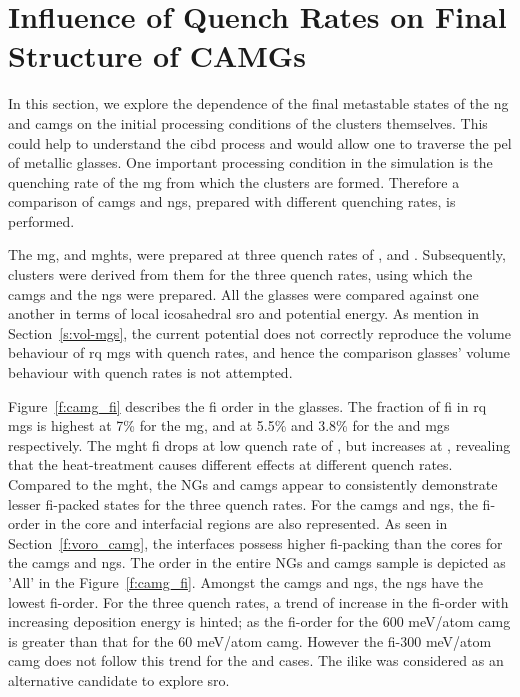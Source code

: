 %
\section{Influence of Quench Rates on Final Structure of CAMGs} \label{s:camg_quenchrt}

\begin{changebar}
In this section, we explore the dependence of the final metastable states of the \gls{ng} and \gls{camg}s on the initial processing conditions of the clusters themselves. This could help to understand the \gls{cibd} process and would allow one to traverse the \gls{pel} of metallic glasses. One important processing condition in the simulation is the quenching rate of the \gls{mg} from which the clusters are formed. Therefore a comparison of \gls{camg}s and \gls{ng}s, prepared with different quenching rates, is performed. \par
\end{changebar}

The \gls{mg}, and \gls{mght}s, were prepared at three quench rates of ,  and . Subsequently, clusters were derived from them for the three quench rates, using which the \gls{camg}s and the \gls{ng}s were prepared. All the glasses were compared against one another in terms of local icosahedral \gls{sro} and potential energy. As mention in Section~\ref{s:vol-mgs}, the current potential does not correctly reproduce the volume behaviour of \gls{rq} \gls{mg}s with quench rates, and hence the comparison glasses' volume behaviour with quench rates is not attempted. \par

Figure~\ref{f:camg_fi} describes the \gls{fi} order in the glasses. The fraction of \gls{fi} in \gls{rq} \gls{mg}s is highest at 7\% for the  \gls{mg}, and at 5.5\% and 3.8\% for the  and  \gls{mg}s respectively. The \gls{mght} \gls{fi} drops at low quench rate of , but increases at , revealing that the heat-treatment causes different effects at different quench rates. Compared to the \gls{mght}, the NGs and \gls{camg}s appear to consistently demonstrate lesser \gls{fi}-packed states for the three quench rates. For the \gls{camg}s and \gls{ng}s, the \gls{fi}-order in the core and interfacial regions are also represented. As seen in Section~\ref{f:voro_camg}, the interfaces possess higher \gls{fi}-packing than the cores for the \gls{camg}s and \gls{ng}s. The order in the entire NGs and \gls{camg}s sample is depicted as 'All' in the Figure~\ref{f:camg_fi}. Amongst the \gls{camg}s and \gls{ng}s, the \gls{ng}s have the lowest \gls{fi}-order. For the three quench rates, a trend of increase in the \gls{fi}-order with increasing deposition energy is hinted; as the \gls{fi}-order for the 600 meV/atom \gls{camg} is greater than that for the 60 meV/atom \gls{camg}. However the \gls{fi}-300 meV/atom \gls{camg} does not follow this trend for the  and  cases. The \gls{ilike} was considered as an alternative candidate to explore \gls{sro}. \par

